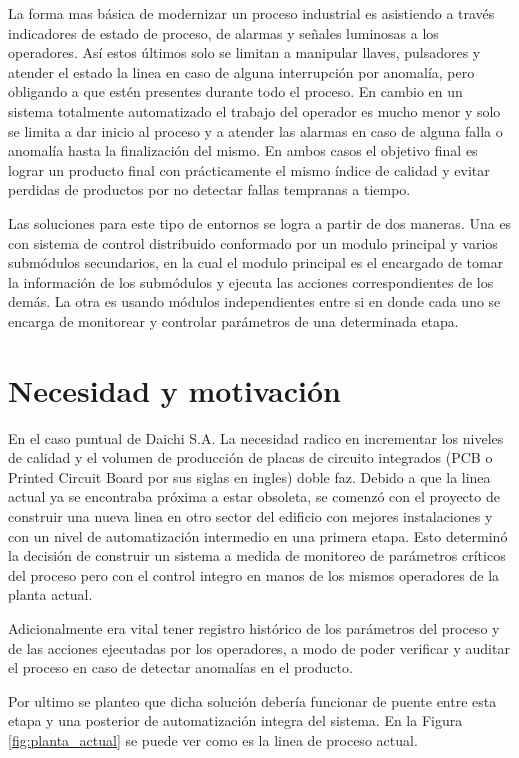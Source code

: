 La forma mas básica de modernizar un proceso industrial es asistiendo a través indicadores de estado de proceso, de alarmas y señales luminosas a los operadores. Así estos últimos solo se limitan a manipular llaves, pulsadores y atender el estado la linea en caso de alguna interrupción por anomalía, pero obligando a que estén presentes durante todo el proceso. 
En cambio en un sistema totalmente automatizado el trabajo del operador es mucho menor y solo se limita a dar inicio al proceso y a atender las alarmas en caso de alguna falla o anomalía hasta la finalización del mismo.
En ambos casos el objetivo final es lograr un producto final con prácticamente el mismo índice de calidad y evitar perdidas de productos por no detectar fallas tempranas a tiempo.


Las soluciones para este tipo de entornos se logra a partir de dos maneras. Una es con sistema de control distribuido conformado por un modulo principal y varios submódulos secundarios, en la cual el modulo principal es el encargado de tomar la información de los submódulos y ejecuta las acciones correspondientes de los demás. 
La otra es usando módulos independientes entre si en donde cada uno se encarga de monitorear y controlar parámetros de una determinada etapa.

\section{ Necesidad y motivación }

En el caso puntual de Daichi S.A. La necesidad radico en incrementar los niveles de calidad y el volumen de producción de placas de circuito integrados (PCB o Printed Circuit Board por sus siglas en ingles) doble faz. Debido a que la linea actual ya se encontraba próxima a estar obsoleta, se comenzó con el proyecto de construir una nueva linea en otro sector del edificio con mejores instalaciones y con un nivel de automatización intermedio en una primera etapa. 
Esto determinó la decisión de construir un sistema a medida de monitoreo de parámetros críticos del proceso pero con el control integro en manos de los mismos operadores de la planta actual.

Adicionalmente era vital tener registro histórico de los parámetros del proceso y de las acciones ejecutadas por los operadores, a modo de poder verificar y auditar el proceso en caso de detectar anomalías en el producto.

Por ultimo se planteo que dicha solución debería funcionar de puente entre esta etapa y una posterior de automatización integra del sistema. En la Figura \ref{fig:planta_actual} se puede ver como es la linea de proceso actual.

